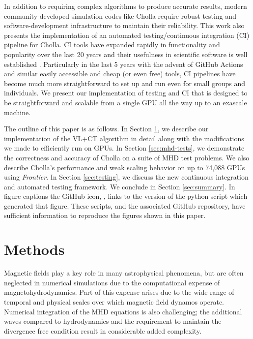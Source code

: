 \documentclass[modern, linenumbers]{aastex631}
\newcommand*{\img}[1]{%
    \raisebox{-.3\baselineskip}{%
        \texttt{[image: \#1]}%
    }%
}
\begin{document}
In addition to requiring complex algorithms to produce accurate results, modern community-developed simulation codes like Cholla require robust testing and software-development infrastructure to maintain their reliability. This work also presents the implementation of an automated testing/continuous integration (CI) pipeline for Cholla. CI tools have expanded rapidly in functionality and popularity over the last 20 years and their usefulness in scientific software is well established \citep{beck_1999, wilson_2014,wilson_2017}. Particularly in the last 5 years with the advent of GitHub Actions and similar easily accessible and cheap (or even free) tools, CI pipelines have become much more straightforward to set up and run even for small groups and individuals. We present our implementation of testing and CI that is designed to be straightforward and scalable from a single GPU all the way up to an exascale machine.

The outline of this paper is as follows. In Section \ref{sec:methods}, we describe our implementation of the VL+CT algorithm in detail along with the modifications we made to efficiently run on GPUs. In Section \ref{sec:mhd-tests}, we demonstrate the correctness and accuracy of Cholla on a suite of MHD test problems. We also describe Cholla's performance and weak scaling behavior on up to 74,088 GPUs using \textit{Frontier}. In Section \ref{sec:testing}, we discuss the new continuous integration and automated testing framework. We conclude in Section \ref{sec:summary}. In figure captions the GitHub icon, \img{github.png}, links to the version of the python script which generated that figure. These scripts, and the associated GitHub repository, have sufficient information to reproduce the figures shown in this paper.


\section{Methods}
\label{sec:methods}

Magnetic fields play a key role in many astrophysical phenomena, but are often neglected in numerical simulations due to the computational expense of magnetohydrodynamics. Part of this expense arises due to the wide range of temporal and physical scales over which magnetic field dynamos operate. Numerical integration of the MHD equations is also challenging; the additional waves compared to hydrodynamics and the requirement to maintain the divergence free condition result in considerable added complexity.
\end{document}
